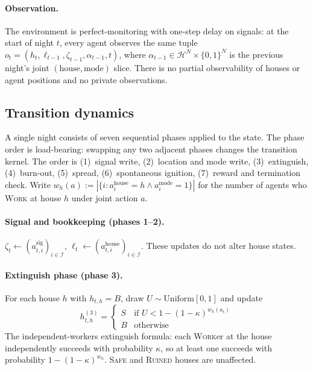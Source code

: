 \documentclass{anvil-paper}
\begin{document}
\paragraph{Observation.} The environment is perfect-monitoring with
one-step delay on signals: at the start of night $t$, every agent
observes the same tuple
$o_t=(h_t,\ell_{t-1},\zeta_{t-1},\alpha_{t-1},t)$, where
$\alpha_{t-1}\in\mathcal{H}^N\times\{0,1\}^N$ is the previous night's
joint $(\text{house},\text{mode})$ slice. There is no partial
observability of houses or agent positions and no private observations.

\subsection{Transition dynamics}
\label{app:envspec:dynamics}

A single night consists of seven sequential phases applied to the state.
The phase order is load-bearing: swapping any two adjacent phases changes
the transition kernel. The order is (1)~signal write, (2)~location and
mode write, (3)~extinguish, (4)~burn-out, (5)~spread, (6)~spontaneous
ignition, (7)~reward and termination check. Write
$w_h(a):=|\{i:a_i^{\text{house}}=h\land a_i^{\text{mode}}=1\}|$ for the
number of agents who \textsc{Work} at house $h$ under joint action $a$.

\paragraph{Signal and bookkeeping (phases 1--2).}
$\zeta_t\leftarrow(a_{t,i}^{\text{sig}})_{i\in\mathcal{I}}$,
$\ell_t\leftarrow(a_{t,i}^{\text{house}})_{i\in\mathcal{I}}$. These
updates do not alter house states.

\paragraph{Extinguish phase (phase 3).}
For each house $h$ with $h_{t,h}=B$, draw $U\sim\mathrm{Uniform}[0,1]$
and update
\[
  h_{t,h}^{(3)} = \begin{cases}
    S & \text{if } U < 1-(1-\kappa)^{w_h(a_t)} \\
    B & \text{otherwise}
  \end{cases}
\]
The independent-workers extinguish formula: each \textsc{Work}er at the
house independently succeeds with probability $\kappa$, so at least one
succeeds with probability $1-(1-\kappa)^{w_h}$. \textsc{Safe} and
\textsc{Ruined} houses are unaffected.
\end{document}
